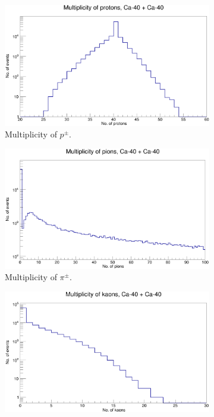 \documentclass[12pt, twocolumn]{article}
\begin{document}
\begin{figure}[h]
\centering
\begin{subfigure}[h]{0.49\textwidth}
\centering
\includegraphics[scale=0.14]{ProtonMultiplicity_Ca.png}
\caption{Multiplicity of $p^{\pm}$.}
\label{Multiplicity of protons Ca40.}
\end{subfigure}
\hfill
\vspace*{1.5cm}
\begin{subfigure}[h]{0.49\textwidth}
\centering
\includegraphics[scale=0.14]{PionMultiplicity_Ca.png}
\caption{Multiplicity of $\pi^{\pm}$.}
\label{Multiplicity of pions Ca40.}
\end{subfigure}
\hfill
\begin{subfigure}[h]{0.49\textwidth}
\centering
\includegraphics[scale=0.14]{KaonMultiplicity_Ca.png}

\end{subfigure}
\end{figure}
\end{document}

